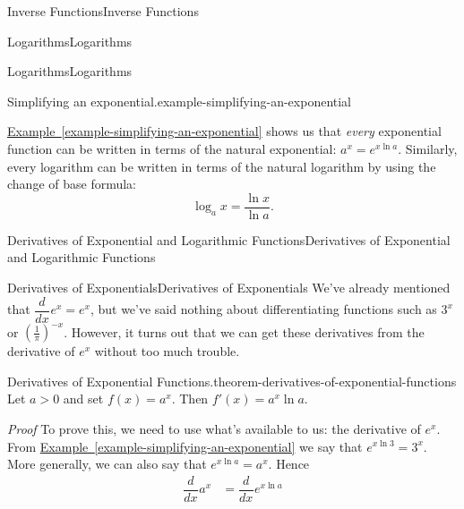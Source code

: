 \documentclass[10pt,]{book}
\makeatletter
\renewcommand*{\proofname}{Proof}
\renewenvironment{proof}[1][\proofname]{\par
  \pushQED{\qed}%
  \normalfont \topsep6\p@\@plus6\p@\relax
  \trivlist
  \item\relax
    {\itshape
    #1\@addpunct{.}}\hspace\labelsep\ignorespaces
}{%
  \popQED\endtrivlist\@endpefalse
}
\numberwithin{equation}{section}
\newcommand{\dv}[3][]{\dfrac{d^{#1} #2}{d #3^{#1}}}
\makeatother
\begin{document}
\begin{chapterptx}{Inverse Functions}{}{Inverse Functions}{}{}
\begin{sectionptx}{Logarithms}{}{Logarithms}{}{}
\begin{subsectionptx}{Logarithms}{}{Logarithms}{}{}
\begin{example}{Simplifying an exponential.}{example-simplifying-an-exponential}
%
\end{example}
\hypertarget{p-225}{}%
\hyperref[example-simplifying-an-exponential]{Example~\ref{example-simplifying-an-exponential}} shows us that \emph{every} exponential function can be written in terms of the natural exponential: \(a^{x} = e^{x\ln a}\). Similarly, every logarithm can be written in terms of the natural logarithm by using the change of base formula:%
\begin{equation*}
\log_{a}x = \frac{\ln x}{\ln a}.
\end{equation*}
%
\end{subsectionptx}
\end{sectionptx}
%
%
\typeout{************************************************}
\typeout{************************************************}
%
\begin{sectionptx}{Derivatives of Exponential and Logarithmic Functions}{}{Derivatives of Exponential and Logarithmic Functions}{}{}\label{section-derivatives-of-exponential-and-logarithmic-functions}
%
%
\typeout{************************************************}
\typeout{************************************************}
%
\begin{subsectionptx}{Derivatives of Exponentials}{}{Derivatives of Exponentials}{}{}\label{subsection-derivatives-of-exponentials}
\hypertarget{p-226}{}%
We've already mentioned that \(\dv{}{x}e^{x} = e^{x}\), but we've said nothing about differentiating functions such as \(3^{x}\) or \((\frac{1}{\pi})^{-x}\). However, it turns out that we can get these derivatives from the derivative of \(e^{x}\) without too much trouble.%
\begin{theorem}{Derivatives of Exponential Functions.}{}{theorem-derivatives-of-exponential-functions}%
\hypertarget{p-227}{}%
Let \(a > 0\) and set \(f(x) = a^{x}\). Then \(f'(x) = a^{x}\ln a\).%
\end{theorem}
\begin{proof}\hypertarget{proof-5}{}
\hypertarget{p-228}{}%
To prove this, we need to use what's available to us: the derivative of \(e^{x}\). From \hyperref[example-simplifying-an-exponential]{Example~\ref{example-simplifying-an-exponential}} we say that \(e^{x\ln 3} = 3^{x}\). More generally, we can also say that \(e^{x\ln a} = a^{x}\). Hence%
\begin{align*}
\dv{}{x}a^{x} & = \dv{}{x}e^{x\ln a} \\

\end{align*}
\end{proof}
\end{subsectionptx}
\end{sectionptx}
\end{chapterptx}
\end{document}
